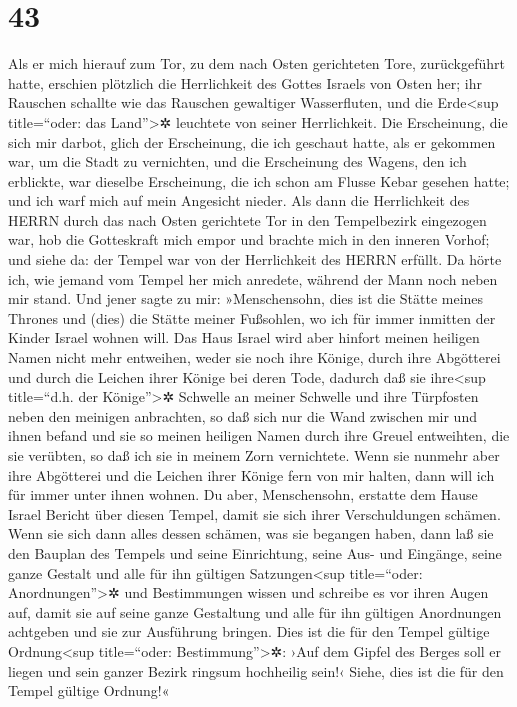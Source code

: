\hypertarget{section-42}{%
\section{43}\label{section-42}}

Als er mich hierauf zum Tor, zu dem nach Osten gerichteten
Tore, zurückgeführt hatte, erschien plötzlich die
Herrlichkeit des Gottes Israels von Osten her; ihr Rauschen schallte wie
das Rauschen gewaltiger Wasserfluten, und die Erde\textless sup
title=``oder: das Land''\textgreater✲ leuchtete von seiner Herrlichkeit.
Die Erscheinung, die sich mir darbot, glich der
Erscheinung, die ich geschaut hatte, als er gekommen war, um die Stadt
zu vernichten, und die Erscheinung des Wagens, den ich erblickte, war
dieselbe Erscheinung, die ich schon am Flusse Kebar gesehen hatte; und
ich warf mich auf mein Angesicht nieder. Als dann die
Herrlichkeit des HERRN durch das nach Osten gerichtete Tor in den
Tempelbezirk eingezogen war, hob die Gotteskraft mich
empor und brachte mich in den inneren Vorhof; und siehe da: der Tempel
war von der Herrlichkeit des HERRN erfüllt. Da hörte ich,
wie jemand vom Tempel her mich anredete, während der Mann noch neben mir
stand. Und jener sagte zu mir: »Menschensohn, dies ist die
Stätte meines Thrones und (dies) die Stätte meiner Fußsohlen, wo ich für
immer inmitten der Kinder Israel wohnen will. Das Haus Israel wird aber
hinfort meinen heiligen Namen nicht mehr entweihen, weder sie noch ihre
Könige, durch ihre Abgötterei und durch die Leichen ihrer Könige bei
deren Tode, dadurch daß sie ihre\textless sup title=``d.h.
der Könige''\textgreater✲ Schwelle an meiner Schwelle und ihre
Türpfosten neben den meinigen anbrachten, so daß sich nur die Wand
zwischen mir und ihnen befand und sie so meinen heiligen Namen durch
ihre Greuel entweihten, die sie verübten, so daß ich sie in meinem Zorn
vernichtete. Wenn sie nunmehr aber ihre Abgötterei und die
Leichen ihrer Könige fern von mir halten, dann will ich für immer unter
ihnen wohnen. Du aber, Menschensohn, erstatte dem Hause
Israel Bericht über diesen Tempel, damit sie sich ihrer Verschuldungen
schämen. Wenn sie sich dann alles dessen schämen, was sie
begangen haben, dann laß sie den Bauplan des Tempels und seine
Einrichtung, seine Aus- und Eingänge, seine ganze Gestalt und alle für
ihn gültigen Satzungen\textless sup title=``oder:
Anordnungen''\textgreater✲ und Bestimmungen wissen und schreibe es vor
ihren Augen auf, damit sie auf seine ganze Gestaltung und alle für ihn
gültigen Anordnungen achtgeben und sie zur Ausführung bringen.
Dies ist die für den Tempel gültige Ordnung\textless sup
title=``oder: Bestimmung''\textgreater✲: ›Auf dem Gipfel des Berges soll
er liegen und sein ganzer Bezirk ringsum hochheilig sein!‹ Siehe, dies
ist die für den Tempel gültige Ordnung!«


